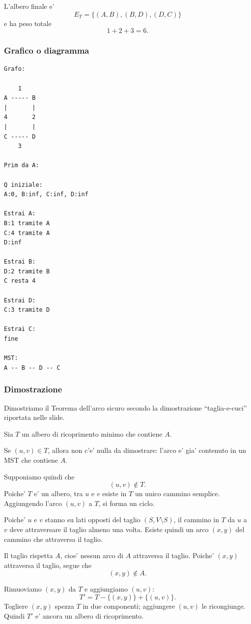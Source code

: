 L'albero finale e'
\[
E_T=\{(A,B),(B,D),(D,C)\}
\]
e ha peso totale
\[
1+2+3=6.
\]

\subsubsection{Grafico o diagramma}
\begin{center}
\begin{verbatim}
Grafo:

    1
A ----- B
|       |
4       2
|       |
C ----- D
    3

Prim da A:

Q iniziale:
A:0, B:inf, C:inf, D:inf

Estrai A:
B:1 tramite A
C:4 tramite A
D:inf

Estrai B:
D:2 tramite B
C resta 4

Estrai D:
C:3 tramite D

Estrai C:
fine

MST:
A -- B -- D -- C
\end{verbatim}
\end{center}

\subsubsection{Dimostrazione}
Dimostriamo il Teorema dell'arco sicuro secondo la dimostrazione ``taglia-e-cuci'' riportata nelle slide.

Sia $T$ un albero di ricoprimento minimo che contiene $A$.

Se $(u,v)\in T$, allora non c'e' nulla da dimostrare: l'arco e' gia' contenuto in un MST che contiene $A$.

Supponiamo quindi che
\[
(u,v)\notin T.
\]
Poiche' $T$ e' un albero, tra $u$ e $v$ esiste in $T$ un unico cammino semplice. Aggiungendo l'arco $(u,v)$ a $T$, si forma un ciclo.

Poiche' $u$ e $v$ stanno su lati opposti del taglio $(S,V\setminus S)$, il cammino in $T$ da $u$ a $v$ deve attraversare il taglio almeno una volta. Esiste quindi un arco $(x,y)$ del cammino che attraversa il taglio.

Il taglio rispetta $A$, cioe' nessun arco di $A$ attraversa il taglio. Poiche' $(x,y)$ attraversa il taglio, segue che
\[
(x,y)\notin A.
\]

Rimuoviamo $(x,y)$ da $T$ e aggiungiamo $(u,v)$:
\[
T'=T-\{(x,y)\}+\{(u,v)\}.
\]
Togliere $(x,y)$ spezza $T$ in due componenti; aggiungere $(u,v)$ le ricongiunge. Quindi $T'$ e' ancora un albero di ricoprimento.


